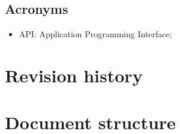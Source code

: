 %
% 
%



\subsection{Acronyms}
\begin{itemize}
\item API: Application Programming Interface;
\end{itemize}


\section{Revision history}

\section{Document structure}


 
